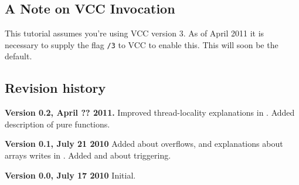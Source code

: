 \subsection{A Note on VCC Invocation}
\label{sect:todo-invoke}
This tutorial assumes you're using VCC version 3. 
As of April 2011 it is necessary to supply the flag \texttt{/3}
to VCC to enable this.
This will soon be the default.

\subsection{Revision history}


\noindent \textbf{Version 0.2, April ?? 2011.}
Improved thread-locality explanations in .
Added description of pure functions.

\noindent \textbf{Version 0.1, July 21 2010}
Added  about overflows, and explanations about arrays writes in .
Added  and  about triggering.

\noindent \textbf{Version 0.0, July 17 2010}
Initial.


